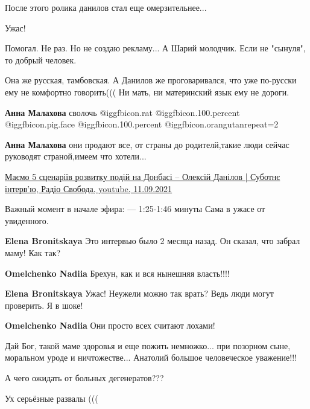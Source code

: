 \begin{itemize}
После этого ролика данилов стал еще омерзительнее...

Ужас!

Помогал. Не раз. Но не создаю рекламу... А Шарий молодчик. Если не "сынуля", то добрый человек.


Она же русская, тамбовская. А Данилов же проговаривался, что уже по-русски ему
не комфортно говорить((( Ни мать, ни материнский язык ему не дороги.

\begin{itemize} %
\textbf{Анна Малахова} сволочь @igg{fbicon.rat}  @igg{fbicon.100.percent}  @igg{fbicon.pig.face}  @igg{fbicon.100.percent}  @igg{fbicon.orangutan}{repeat=2} 

\textbf{Анна Малахова} они продают все, от страны до родителй,такие люди сейчас руководят страной,имеем что хотели...
\end{itemize} %


\href{https://youtu.be/_fFM1YAbU8I}{%
Маємо 5 сценаріїв розвитку подій на Донбасі – Олексій Данілов | Суботнє інтерв’ю, Радіо Свобода, youtube, %
11.09.2021%
}

Важный момент в начале эфира: — 1:25-1:46 минуты
Сама в ужасе от увиденного.

\begin{itemize} %
\textbf{Elena Bronitskaya}
Это интервью было 2 месяца назад. Он сказал, что забрал маму!
Как так?

\textbf{Omelchenko Nadiia} Брехун, как и вся нынешняя власть!!!!

\textbf{Elena Bronitskaya}
Ужас! Неужели можно так врать? Ведь люди могут проверить. Я в шоке!

\textbf{Omelchenko Nadiia} Они просто всех считают лохами!
\end{itemize} %


Дай Бог, такой маме здоровья и еще пожить немножко... при позорном сыне,
моральном уроде и ничтожестве... Анатолий большое человеческое уважение!!!


А чего ожидать от больных дегенератов???

Ух серьёзные развалы (((


\end{itemize}
